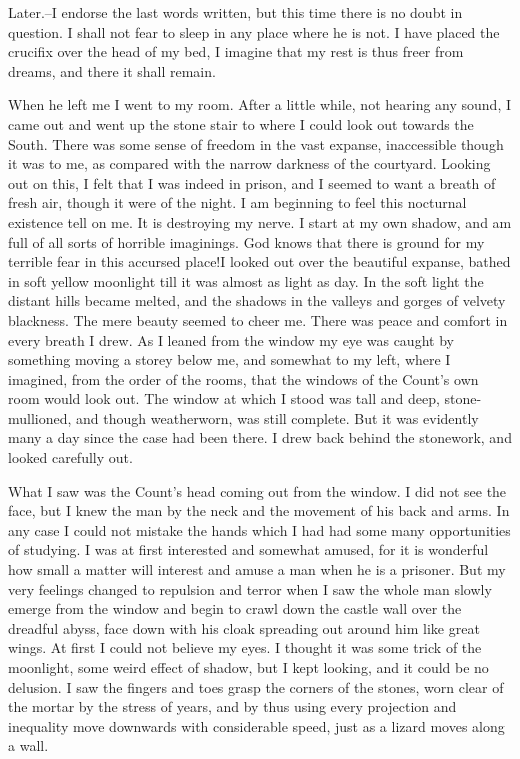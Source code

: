 Later.--I endorse the last words written, but this time there is no doubt in question. I shall not fear to sleep in any place where he is not. I have placed the crucifix over the head of my bed, I imagine that my rest is thus freer from dreams, and there it shall remain. 

When he left me I went to my room. After a little while, not hearing any sound, I came out and went up the stone stair to where I could look out towards the South. There was some sense of freedom in the vast expanse, inaccessible though it was to me, as compared with the narrow darkness of the courtyard. Looking out on this, I felt that I was indeed in prison, and I seemed to want a breath of fresh air, though it were of the night. I am beginning to feel this nocturnal existence tell on me. It is destroying my nerve. I start at my own shadow, and am full of all sorts of horrible imaginings. God knows that there is ground for my terrible fear in this accursed place!I looked out over the beautiful expanse, bathed in soft yellow moonlight till it was almost as light as day. In the soft light the distant hills became melted, and the shadows in the valleys and gorges of velvety blackness. The mere beauty seemed to cheer me. There was peace and comfort in every breath I drew. As I leaned from the window my eye was caught by something moving a storey below me, and somewhat to my left, where I imagined, from the order of the rooms, that the windows of the Count's own room would look out. The window at which I stood was tall and deep, stone-mullioned, and though weatherworn, was still complete. But it was evidently many a day since the case had been there. I drew back behind the stonework, and looked carefully out. 

What I saw was the Count's head coming out from the window. I did not see the face, but I knew the man by the neck and the movement of his back and arms. In any case I could not mistake the hands which I had had some many opportunities of studying. I was at first interested and somewhat amused, for it is wonderful how small a matter will interest and amuse a man when he is a prisoner. But my very feelings changed to repulsion and terror when I saw the whole man slowly emerge from the window and begin to crawl down the castle wall over the dreadful abyss, face down with his cloak spreading out around him like great wings. At first I could not believe my eyes. I thought it was some trick of the moonlight, some weird effect of shadow, but I kept looking, and it could be no delusion. I saw the fingers and toes grasp the corners of the stones, worn clear of the mortar by the stress of years, and by thus using every projection and inequality move downwards with considerable speed, just as a lizard moves along a wall. 

